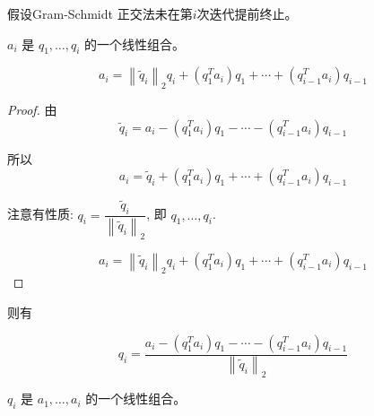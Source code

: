 假设Gram-Schmidt 正交法未在第$i$次迭代提前终止。

\begin{corollary}
    $ a_{i} $ 是 $ q_{1}, \ldots, q_{i} $ 的一个线性组合。
    
    \begin{equation} a_{i}=\left\|\tilde{q}_{i}\right\|_{2} q_{i}+\left(q_{1}^{T} a_{i}\right) q_{1}+\cdots+\left(q_{i-1}^{T} a_{i}\right) q_{i-1} \end{equation}
\end{corollary}

\begin{proof}
    由
    \begin{equation} \tilde{q}_{i}=a_{i}-\left(q_{1}^{T} a_{i}\right) q_{1}-\cdots-\left(q_{i-1}^{T} a_{i}\right) q_{i-1} \end{equation}

    所以
    \begin{equation}a_{i}= \tilde{q}_{i}+\left(q_{1}^{T} a_{i}\right) q_{1}+\cdots+\left(q_{i-1}^{T} a_{i}\right) q_{i-1} \end{equation}

    注意有性质: $
    q_{i}=\dfrac{\tilde{q}_{i}}{\left\|\tilde{q}_{i}\right\|_{2}}$, 即 $ q_{1}, \ldots, q_{i} $.

    \begin{equation} a_{i}=\left\|\tilde{q}_{i}\right\|_{2} q_{i}+\left(q_{1}^{T} a_{i}\right) q_{1}+\cdots+\left(q_{i-1}^{T} a_{i}\right) q_{i-1} \end{equation}
\end{proof}


则有 

\begin{corollary}
    \begin{equation}q_{i} = \frac{a_{i}-\left(q_{1}^{T} a_{i}\right) q_{1}-\cdots-\left(q_{i-1}^{T} a_{i}\right) q_{i-1}}{\left\|\tilde{q}_{i}\right\|_{2}}\end{equation}
\end{corollary}


\begin{corollary}
    $ q_{i} $ 是 $ a_{1}, \ldots, a_{i} $ 的一个线性组合。
\end{corollary}

